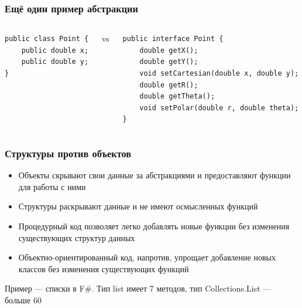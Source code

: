 \documentclass{../../slides-style}
\begin{document}
    \begin{frame}[fragile]
        \frametitle{Ещё один пример абстракции}
        \begin{columns}
            \begin{column}{0.32\textwidth}
                \begin{verbatim}
public class Point {
    public double x;
    public double y;
}
                \end{verbatim}
            \end{column}
            \begin{column}{0.05\textwidth}
                vs
            \end{column}
            \begin{column}{0.65\textwidth}
                \begin{verbatim}
public interface Point {
    double getX();
    double getY();
    void setCartesian(double x, double y);
    double getR();
    double getTheta();
    void setPolar(double r, double theta);
}
                \end{verbatim}
            \end{column}
        \end{columns}
    \end{frame}

    \begin{frame}
        \frametitle{Структуры против объектов}
        \begin{itemize}
            \item Объекты скрывают свои данные за абстракциями и предоставляют функции для работы с ними
            \item Структуры раскрывают данные и не имеют осмысленных функций
        \end{itemize}
        \vspace{3mm}
        \begin{itemize}
            \item Процедурный код позволяет легко добавлять новые функции без изменения существующих структур данных
            \item Объектно-ориентированный код, напротив, упрощает добавление новых классов без изменения существующих функций
        \end{itemize}
        \vspace{3mm}
        Пример --- списки в F\#. Тип list имеет 7 методов, тип Collections.List --- больше 60
    \end{frame}
\end{document}
